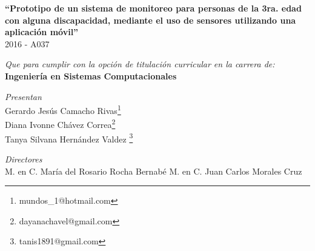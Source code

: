 \begin{titlepage}
    \LARGE \textbf{ ``Prototipo de un sistema de monitoreo para personas de la 3ra. edad con alguna discapacidad, mediante el uso de sensores utilizando una aplicación móvil''}
    \LARGE{\\ 2016 - A037}

    \vspace{0.5cm} %

    \LARGE \textit{Que para cumplir con la opción de titulación curricular en la carrera de:}
    \LARGE \textbf{\\ Ingeniería en Sistemas Computacionales}

    \vspace{0.5cm} %

   \textit{Presentan}\\
    Gerardo Jesús Camacho Rivas\footnote{mundos\_1@hotmail.com} \\
   	Diana Ivonne Chávez Correa\footnote{dayanachavel@gmail.com} \\
    Tanya Silvana Hernández Valdez \footnote{tanis1891@gmail.com}
    
    \vspace{0.5cm} %

   \textit{Directores}\\
   M. en C. María del Rosario Rocha Bernabé 
   M. en C. Juan Carlos Morales Cruz

\end{titlepage}